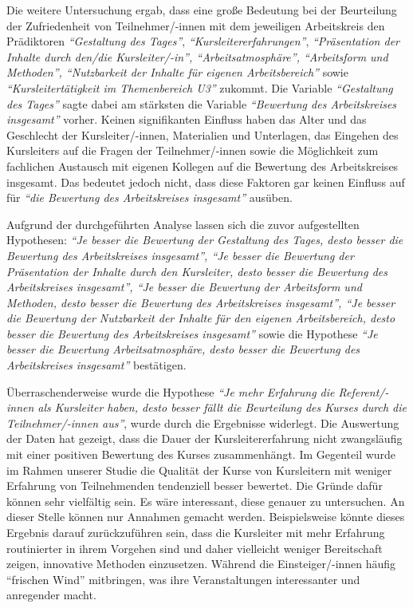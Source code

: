 \documentclass[12pt,a4paper]{article}
\begin{document}
Die weitere Untersuchung ergab, dass eine große Bedeutung bei der Beurteilung der Zufriedenheit von Teilnehmer/-innen mit dem jeweiligen Arbeitskreis den Prädiktoren \textit{"`Gestaltung des Tages"'}, \textit{"`Kursleitererfahrungen"'}, \textit{"`Präsentation der Inhalte durch den/die Kursleiter/-in"', "`Ar\-beits\-at\-mos\-phä\-re"', "`Arbeitsform und Methoden"', "`Nutzbarkeit der Inhalte für eigenen Arbeitsbereich"'} sowie \textit{"`Kursleitertätigkeit im Themenbereich U3"'} zukommt. Die Variable \textit{"`Gestaltung des Tages"'} sagte dabei am stärksten die Variable \textit{"`Bewertung des Arbeitskreises insgesamt"'} vorher. Keinen signifikanten Einfluss haben das Alter und das Geschlecht der Kursleiter/-innen, Materialien und Unterlagen, das Eingehen des Kursleiters auf die Fragen der Teilnehmer/-innen sowie die Möglichkeit zum fachlichen Austausch mit eigenen Kollegen auf die Bewertung des Arbeitskreises insgesamt. Das bedeutet jedoch nicht, dass diese Faktoren gar keinen Einfluss auf für \textit{"`die Bewertung des Arbeitskreises insgesamt"'} ausüben.

Aufgrund der durchgeführten Analyse lassen sich die zuvor aufgestellten Hypothesen: \textit{"`Je besser die Bewertung der Gestaltung des Tages, desto besser die Bewertung des Arbeitskreises insgesamt"', "`Je besser die Bewertung der Präsentation der Inhalte durch den Kursleiter, desto besser die Bewertung des Arbeitskreises insgesamt"', "`Je besser die Bewertung der Arbeitsform und Methoden, desto besser die Bewertung des Arbeitskreises insgesamt"', "`Je besser die Bewertung der Nutzbarkeit der Inhalte für den eigenen Arbeitsbereich, desto besser die Bewertung des Arbeitskreises insgesamt"'} sowie die Hypothese \textit{"`Je besser die Bewertung Arbeitsatmosphäre, desto besser die Bewertung des Arbeitskreises insgesamt"'} bestätigen.

Überraschenderweise wurde die Hypothese \textit{"`Je mehr Erfahrung die Re\-fe\-rent/-innen als Kursleiter haben, desto besser fällt die Beurteilung des Kurses durch die Teilnehmer/-innen aus"'}, wurde durch die Ergebnisse widerlegt. Die Auswertung der Daten hat gezeigt, dass die  Dauer der Kursleitererfahrung nicht zwangsläufig mit einer positiven Bewertung des Kurses zusammenhängt. Im Gegenteil wurde im Rahmen unserer Studie die Qualität der Kurse von Kursleitern mit weniger Erfahrung von Teilnehmenden tendenziell besser bewertet. Die Gründe dafür können sehr vielfältig sein. Es wäre interessant, diese genauer zu untersuchen. An dieser Stelle können nur Annahmen gemacht werden. Beispielsweise könnte dieses Ergebnis darauf zurückzuführen sein, dass die Kursleiter mit mehr Erfahrung routinierter in ihrem Vorgehen sind und daher vielleicht weniger Bereitschaft zeigen, innovative Methoden einzusetzen. Während die Einsteiger/-innen häufig "`frischen Wind"' mitbringen, was ihre Veranstaltungen interessanter und anregender macht.
\end{document}
